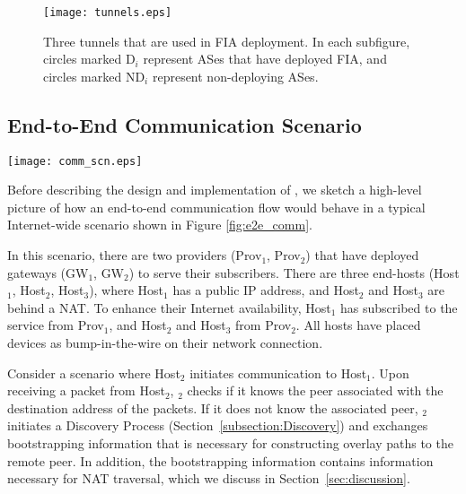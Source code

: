 \begin{figure}
	\centering
	\texttt{[image: tunnels.eps]}
	
	\caption{Three tunnels that are used in FIA deployment. In each subfigure,
		circles marked D$_i$ represent ASes that have deployed FIA, and circles 
		marked
		ND$_i$ represent non-deploying ASes.}
	
	\label{fig:tunnels}
\end{figure}

\subsection{End-to-End Communication Scenario}
\label{sec:e2e_scenario}

\begin{figure*}
\centering
\texttt{[image: comm\_scn.eps]}
\caption{An example of end-to-end communication. The destination identifier is
implemented as the 5-tuple information. See Section~\ref{sec:design}.}
\label{fig:e2e_comm}
\end{figure*}

Before describing the design and implementation of \name, we sketch a
high-level picture of how an end-to-end communication flow would behave in a
typical Internet-wide scenario shown in Figure \ref{fig:e2e_comm}.

In this scenario, there are two \scion providers (Prov$_1$, Prov$_2$) that have
deployed gateways (GW$_1$, GW$_2$) to serve their \scion subscribers. There are
three end-hosts (Host$_1$, Host$_2$, Host$_3$), where Host$_1$ has a public IP
address, and Host$_2$ and Host$_3$ are behind a NAT. To enhance their Internet
availability, Host$_1$ has subscribed to the \scion service from Prov$_1$, and
Host$_2$ and Host$_3$ from Prov$_2$. All hosts have placed \name devices as
bump-in-the-wire on their network connection.

Consider a scenario where Host$_2$ initiates communication to Host$_1$. Upon
receiving a packet from Host$_2$, \namens$_2$ checks if it knows the peer \name
associated with the destination address of the packets. If it does not know the
associated peer, \namens$_2$ initiates a Discovery Process
(Section~\ref{subsection:Discovery}) and exchanges bootstrapping information
that is necessary for constructing \scion overlay paths to the remote peer. In
addition, the bootstrapping information contains information necessary for NAT
traversal, which we discuss in Section~\ref{sec:discussion}.

